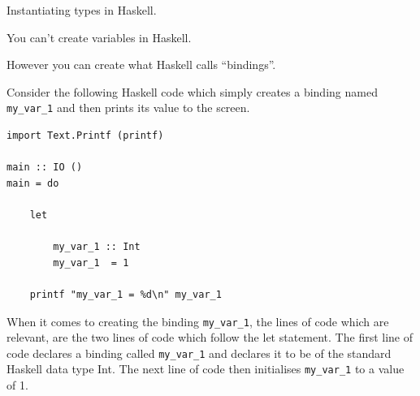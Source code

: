 \begin{frame}[t, fragile]{Instantiating types in Haskell.}

You can't create variables in Haskell.

However you can create what Haskell calls ``bindings''.

Consider the following Haskell code which simply creates a binding named \texttt{my_var_1} and then prints its value to the
screen.

\begin{verbatim}
import Text.Printf (printf)

main :: IO ()
main = do

    let

        my_var_1 :: Int
        my_var_1  = 1

    printf "my_var_1 = %d\n" my_var_1
\end{verbatim}

When it comes to creating the binding \texttt{my_var_1}, the lines of code which are relevant, are the two lines of code
which follow the let statement. The first line of code declares a binding called \texttt{my_var_1} and declares it to be of
the standard Haskell data type Int. The next line of code then initialises \texttt{my_var_1} to a value of 1.

\end{frame}
